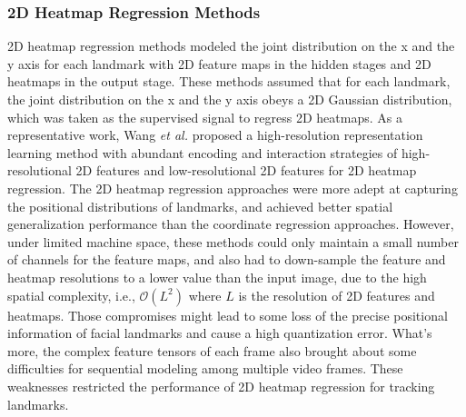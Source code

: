 \documentclass[review]{elsarticle}
\begin{document}
\subsubsection{2D Heatmap Regression Methods} 
2D heatmap regression methods \cite{hourglass, encoder_decoder, how_far, HRnet, CascadedTransformers, RePFormer} modeled the joint distribution on the x and the y axis for each landmark with 2D feature maps in the hidden stages and 2D heatmaps in the output stage. These methods assumed that for each landmark, the joint distribution on the x and the y axis obeys a 2D Gaussian distribution, which was taken as the supervised signal to regress 2D heatmaps.
As a representative work, Wang \textit{et al.} \cite{HRnet} proposed a high-resolution representation learning method with abundant encoding and interaction strategies of high-resolutional 2D features and  low-resolutional 2D features for 2D heatmap regression. The 2D heatmap regression approaches were more adept at capturing the positional distributions of landmarks, and achieved better spatial generalization performance than the coordinate regression approaches. However, under limited machine space, these methods could only maintain a small number of channels for the feature maps, and also had to down-sample the feature and heatmap resolutions to a lower value than the input image, due to the high spatial complexity, i.e., $\mathcal{O}(L^2)$ where $L$ is the resolution of 2D features and heatmaps. Those compromises might lead to some loss of the precise positional information of facial landmarks and cause a high quantization error. What's more, the complex feature tensors of each frame also brought about some difficulties for sequential modeling among multiple video frames. These weaknesses restricted the performance of 2D heatmap regression for tracking landmarks.

%
%
%
%
%
%
\end{document}

